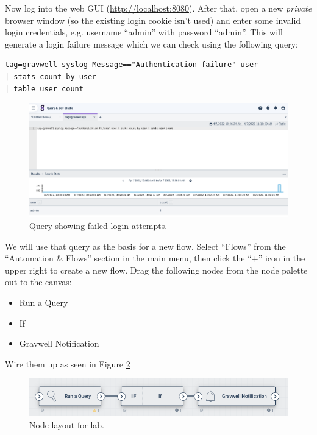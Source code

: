 Now log into the web GUI (\href{http://localhost:8080}{http://localhost:8080}). After that, open a new \emph{private} browser window (so the existing login cookie isn't used) and enter some invalid login credentials, e.g. username ``admin'' with password ``admin''. This will generate a login failure message which we can check using the following query:

\begin{Verbatim}[breaklines=true]
tag=gravwell syslog Message=="Authentication failure" user 
| stats count by user 
| table user count
\end{Verbatim}

\begin{figure}
	\includegraphics[width=0.85\linewidth]{images/lab-failed-logins.png}
	\caption{Query showing failed login attempts.}
	\label{fig:lab-failed-logins}
\end{figure}

We will use that query as the basis for a new flow. Select ``Flows'' from the ``Automation \& Flows'' section in the main menu, then click the ``+'' icon in the upper right to create a new flow. Drag the following nodes from the node palette out to the canvas:

\begin{itemize}
\item Run a Query
\item If
\item Gravwell Notification
\end{itemize}

Wire them up as seen in Figure \ref{fig:lab-nodes}

\begin{figure}
	\includegraphics[width=0.7\linewidth]{images/lab-nodes.png}
	\caption{Node layout for lab.}
	\label{fig:lab-nodes}
\end{figure}

